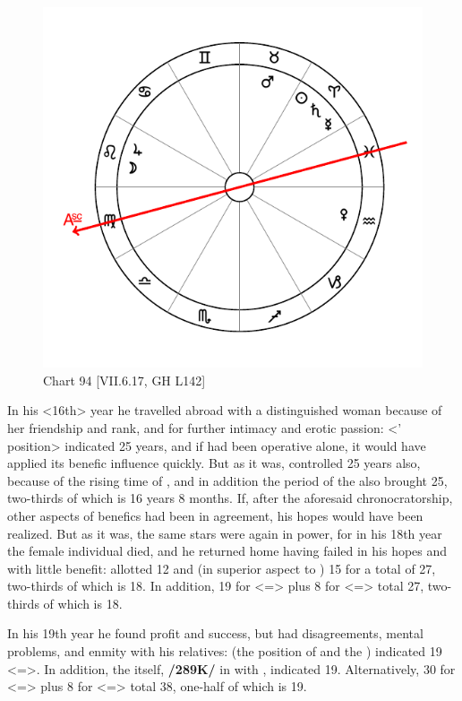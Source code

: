 \begin{figure}
\centering
\vspace{-20pt}
\includegraphics[width=.68\textwidth]{charts/7_6_17}
\caption{Chart 94 [VII.6.17, GH L142] }
\label{fig:chart94}
\end{figure} 

In his <16th> year he travelled abroad with a distinguished
woman because of her friendship and rank, and for further intimacy and erotic passion: \Aquarius\xspace <\Venus’ position> indicated 25 years, and if \Venus\xspace had been operative alone, it would have applied its benefic influence quickly. But as it was, \Mars\xspace controlled 25 years also, because of the rising time of \Taurus, and in addition the period of the \Moon\xspace also brought 25, two-thirds of which is 16 years 8 months. If, after the aforesaid chronocratorship, other aspects of benefics had been in agreement, his hopes would have been realized. But as it was, the same stars were again in power, for in his 18th year the female individual died,
and he returned home having failed in his hopes and with little benefit: \Jupiter\xspace allotted 12 and \Mars\xspace (in superior aspect to \Jupiter) 15 for a total of 27, two-thirds of which is 18. In addition, 19 for \Leo\xspace <=\Sun> plus 8 for \Taurus\xspace <=\Venus> total 27, two-thirds of which is 18.

In his 19th year he found profit and success, but had disagreements, mental problems, and enmity with his relatives: \Leo\xspace (the position of \Jupiter\xspace and the \Moon) indicated 19 <=\Sun>. In addition, the \Sun\xspace itself, \textbf{/289K/} in \Aries\xspace with \Saturn, indicated 19. Alternatively, 30 for \Aquarius\xspace <=\Saturn> plus 8 for \Taurus\xspace
<=\Venus> total 38, one-half of which is 19. 

